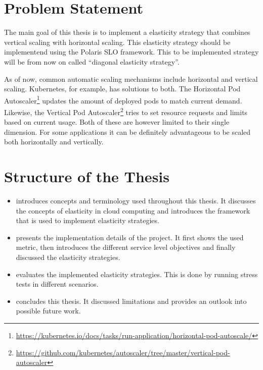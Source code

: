 \section{Problem Statement}
\label{sec:problem-statement}

The main goal of this thesis is to implement a elasticity strategy that combines vertical scaling with horizontal scaling. This elasticity strategy should be implementend using the Polaris SLO framework. This to be implemented strategy will be from now on called ``diagonal elasticity strategy''.

As of now, common automatic scaling mechanisms include horizontal and vertical scaling. Kubernetes, for example, has solutions to both. The Horizontal Pod Autoscaler\footnote{\raggedright\url{https://kubernetes.io/docs/tasks/run-application/horizontal-pod-autoscale/}} updates the amount of deployed pods to match current demand. Likewise, the Vertical Pod Autoscaler\footnote{\raggedright\url{https://github.com/kubernetes/autoscaler/tree/master/vertical-pod-autoscaler}} tries to set resource requests and limits based on current usage. Both of these are however limited to their single dimension. For some applications it can be definitely advantageous to be scaled both horizontally and vertically.

\section{Structure of the Thesis}
\label{sec:structure}

\begin{itemize}
    \item {} introduces concepts and terminology used throughout this thesis. It discusses the concepts of elasticity in cloud computing and introduces the framework that is used to implement elasticity strategies.

    \item {} presents the implementation details of the project. It first shows the used metric, then introduces the different service level objectives and finally discussed the elasticity strategies.

    \item {} evaluates the implemented elasticity strategies. This is done by running stress tests in different scenarios.

    \item {} concludes this thesis. It discussed limitations and provides an outlook into possible future work.
\end{itemize}
